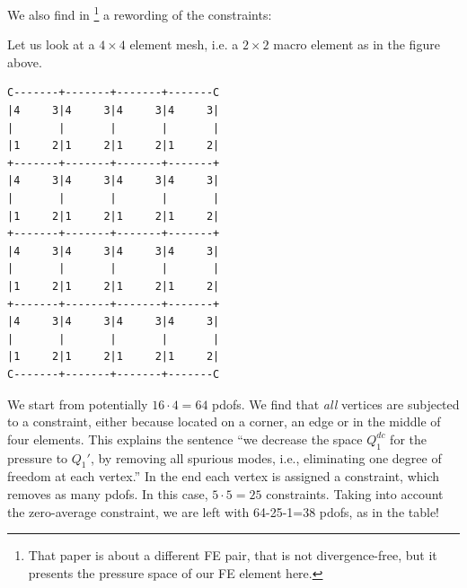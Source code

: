 We also find in \textcite{zhmu16}\footnote{That paper is about a different 
FE pair, that is not divergence-free, but it presents the pressure space
of our FE element here.} a rewording of the constraints:
\begin{center}
\end{center}

Let us look at a $4\times 4$ element mesh, i.e. a $2\times 2$ macro element as in the figure above. 
\begin{verbatim}
C-------+-------+-------+-------C
|4     3|4     3|4     3|4     3|
|       |       |       |       |
|1     2|1     2|1     2|1     2|
+-------+-------+-------+-------+
|4     3|4     3|4     3|4     3|
|       |       |       |       |
|1     2|1     2|1     2|1     2|
+-------+-------+-------+-------+
|4     3|4     3|4     3|4     3|
|       |       |       |       |
|1     2|1     2|1     2|1     2|
+-------+-------+-------+-------+
|4     3|4     3|4     3|4     3|
|       |       |       |       |
|1     2|1     2|1     2|1     2|
C-------+-------+-------+-------C
\end{verbatim}
We start from potentially $16\cdot 4=64$ pdofs. We find that 
{\it all} vertices are subjected to a constraint, either because located on a 
corner, an edge or in the middle of four elements. 
This explains the sentence 
``we decrease the space $Q_1^{dc}$ for the pressure to $Q_1'$, by removing 
all spurious modes, i.e., eliminating one degree of freedom at each vertex.''
In the end each vertex is assigned a constraint, which removes as many 
pdofs. In this case, $5\cdot 5=25$ constraints. Taking into account the zero-average
constraint, we are left with 64-25-1=38 pdofs, as in the table!

